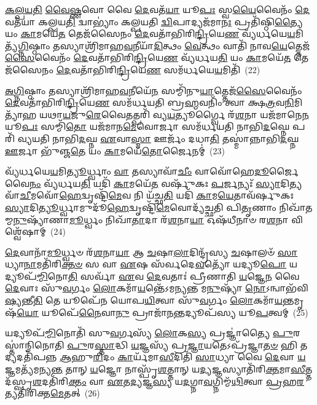 \-\ul{𑌕}\-\-\ul{𑌲𑍍𑌪}\-\-\ul{𑌯}\-\-\ul{𑌤𑌿} \ul{𑌵𑍈}\-\-\ul{𑌷𑍍𑌣}\-𑌵𑍋 𑌵𑍈 \ul{𑌦𑍇}\-𑌵𑌤᳴\-\ul{𑌯𑌾} 𑌯𑍂\-\ul{𑌪𑌃} 𑌸𑍍𑌵\-\ul{𑌯𑍈}\-𑌵𑍈𑌨𑌂᳴ \ul{𑌦𑍇}\-𑌵𑌤᳴𑌯𑌾 𑌕𑌲𑍍𑌪𑌯\-\ul{𑌤𑌿} 𑌦𑍍𑌵𑌾\-𑌭𑍍𑌯𑌾𑌂॑ 𑌕𑌲𑍍𑌪𑌯𑌤𑌿 \ul{𑌦𑍍𑌵𑌿}\-𑌪𑌾𑌦𑍍𑌯𑌜᳴𑌮𑌾\-\ul{𑌨𑌃} 𑌪𑍍𑌰𑌤𑌿᳴𑌷𑍍𑌠𑌿\-\ul{𑌤𑍍𑌯𑍈} 𑌯𑌂 \ul{𑌕𑌾}\-𑌮𑌯𑍇᳴\-\ul{𑌤} 𑌤𑍇𑌜᳴𑌸𑍈𑌨𑌂 \ul{𑌦𑍇}\-𑌵𑌤𑌾᳴𑌭𑌿𑌰𑌿\-\ul{𑌨𑍍𑌦𑍍𑌰𑌿}\-𑌯𑍇\-\ul{𑌣} 𑌵𑍍𑌯᳴𑌰𑍍𑌧𑌯𑍇\-\ul{𑌯}\-𑌮𑌿𑌤𑍍𑌯᳴\-\ul{𑌗𑍍𑌨𑌿}\-𑌷𑍍𑌠𑌾𑌂 𑌤𑌸𑍍𑌯𑌾𑌶𑍍𑌰𑌿᳴𑌮𑌾𑌹\-\ul{𑌵}\-𑌨𑍀𑌯𑌾᳴\-\ul{𑌦𑌿}\-𑌤𑍍𑌥𑌂 \ul{𑌵𑍇}\-𑌤𑍍𑌥𑌂 𑌵𑌾𑌤𑌿᳴ 𑌨𑌾𑌵\-\ul{𑌯𑍇}\-𑌤𑍍𑌤𑍇𑌜᳴\-\ul{𑌸𑍈}\-𑌵𑍈𑌨𑌂᳴ \ul{𑌦𑍇}\-𑌵𑌤𑌾᳴𑌭𑌿𑌰𑌿\-\ul{𑌨𑍍𑌦𑍍𑌰𑌿}\-𑌯𑍇\-\ul{𑌣} 𑌵𑍍𑌯᳴𑌰𑍍𑌧𑌯\-\ul{𑌤𑌿} 𑌯𑌂 \ul{𑌕𑌾}\-𑌮𑌯𑍇᳴\-\ul{𑌤} 𑌤𑍇𑌜᳴𑌸𑍈𑌨𑌂 \ul{𑌦𑍇}\-𑌵𑌤𑌾᳴𑌭𑌿𑌰𑌿\-\ul{𑌨𑍍𑌦𑍍𑌰𑌿}\-𑌯𑍇\-\ul{𑌣} 𑌸𑌮᳴𑌰𑍍𑌧𑌯𑍇\-\ul{𑌯}\-𑌮𑌿𑌤𑌿᳴~(22)

\-\ul{𑌅}\-\-\ul{𑌗𑍍𑌨𑌿}\-𑌷𑍍𑌠𑌾𑌂 𑌤𑌸𑍍𑌯𑌾𑌶𑍍𑌰𑌿᳴𑌮𑌾𑌹\-\ul{𑌵}\-𑌨𑍀𑌯𑍇᳴\-\ul{𑌨} 𑌸𑌮𑍍𑌮𑌿᳴𑌨𑍁\-\ul{𑌯𑌾}\-𑌤𑍍𑌤𑍇𑌜᳴\-\ul{𑌸𑍈}\-𑌵𑍈𑌨𑌂᳴ \ul{𑌦𑍇}\-𑌵𑌤𑌾᳴𑌭𑌿𑌰𑌿\-\ul{𑌨𑍍𑌦𑍍𑌰𑌿}\-𑌯𑍇\-\ul{𑌣} 𑌸𑌮᳴𑌰𑍍𑌧𑌯𑌤𑌿 𑌬𑍍𑌰\-\ul{𑌹𑍍𑌮}\-𑌵𑌨𑌿𑌂᳴ 𑌤𑍍𑌵𑌾 𑌕𑍍𑌷\-\ul{𑌤𑍍𑌰}\-𑌵\-\ul{𑌨𑌿}\-𑌮𑌿𑌤𑍍𑌯𑌾᳴𑌹 𑌯𑌥𑌾\-\ul{𑌯}\-𑌜𑍁\-\ul{𑌰𑍇}\-𑌵𑍈𑌤𑌤𑍍𑌪𑌰𑌿᳴ 𑌵𑍍𑌯\-\ul{𑌯}\-𑌤𑍍𑌯𑍂𑌰𑍍𑌗𑍍𑌵𑍈 𑌰᳴\-\ul{𑌶}\-𑌨𑌾 𑌯𑌜᳴𑌮𑌾𑌨𑍇\-\ul{𑌨} 𑌯𑍂\-\ul{𑌪𑌃} 𑌸𑌮𑍍𑌮𑌿᳴\-\ul{𑌤𑍋} 𑌯𑌜᳴𑌮𑌾𑌨\-\ul{𑌮𑍇}\-𑌵𑍋𑌰𑍍𑌜𑌾 𑌸𑌮᳴𑌰𑍍𑌧𑌯𑌤𑌿 𑌨𑌾𑌭𑌿\-\ul{𑌦}\-𑌘𑍍𑌨𑍇 𑌪𑌰𑌿᳴ 𑌵𑍍𑌯𑌯𑌤𑌿 𑌨𑌾𑌭𑌿\-\ul{𑌦}\-𑌘𑍍𑌨 \ul{𑌏}\-𑌵𑌾\-\ul{𑌸𑍍𑌮𑌾} 𑌊𑌰𑍍𑌜𑌂᳴ 𑌦𑌧𑌾\-\ul{𑌤𑌿} 𑌤𑌸𑍍𑌮𑌾॑𑌨𑍍𑌨𑌾𑌭𑌿\-\ul{𑌦}\-𑌘𑍍𑌨 \ul{𑌊}\-𑌰𑍍𑌜𑌾 𑌭𑍁᳴𑌞𑍍𑌜\-\ul{𑌤𑍇} 𑌯𑌂 \ul{𑌕𑌾}\-𑌮𑌯𑍇᳴\-\ul{𑌤𑍋}\-𑌰𑍍𑌜𑍈𑌨𑌮𑍍॑~(23)

𑌵𑍍𑌯᳴𑌰𑍍𑌧𑌯𑍇\-\ul{𑌯}\-𑌮𑌿\-\ul{𑌤𑍍𑌯𑍂}\-𑌰𑍍𑌧𑍍𑌵𑌾𑌂 \ul{𑌵𑌾} 𑌤𑌸𑍍𑌯𑌾𑌵𑌾᳴\-\ul{𑌚𑍀𑌂} 𑌵𑌾𑌵𑍋᳴𑌹𑍇\-\ul{𑌦𑍂}\-𑌰𑍍𑌜𑍈𑌵𑍈\-\ul{𑌨𑌂} 𑌵𑍍𑌯᳴𑌰𑍍𑌧𑌯\-\ul{𑌤𑌿} 𑌯𑌦𑌿᳴ \ul{𑌕𑌾}\-𑌮𑌯𑍇᳴\-\ul{𑌤} 𑌵𑌰𑍍\mbox{}𑌷𑍁᳴𑌕𑌃 \ul{𑌪}\-𑌰𑍍𑌜𑌨𑍍𑌯𑌃᳴ \ul{𑌸𑍍𑌯𑌾}\-𑌦𑌿𑌤𑍍𑌯𑌵𑌾᳴\-\ul{𑌚𑍀}\-𑌮𑌵𑍋᳴\-\ul{𑌹𑍇}\-\-𑌦𑍍𑌵𑍃𑌷𑍍𑌟𑌿᳴\-\ul{𑌮𑍇}\-𑌵 𑌨𑌿 𑌯᳴𑌚𑍍𑌛\-\ul{𑌤𑌿} 𑌯𑌦𑌿᳴ \ul{𑌕𑌾}\-𑌮\-\ul{𑌯𑍇}\-𑌤𑌾𑌵᳴𑌰𑍍\mbox{}𑌷𑍁𑌕𑌃 \ul{𑌸𑍍𑌯𑌾}\-𑌦𑌿\-\ul{𑌤𑍍𑌯𑍂}\-𑌰𑍍𑌧𑍍𑌵𑌾𑌮𑍁𑌦𑍂᳴\-\ul{𑌹𑍇}\-𑌦𑍍𑌵𑍃𑌷𑍍𑌟𑌿᳴\-\ul{𑌮𑍇}\-𑌵𑍋𑌦𑍍𑌯᳴𑌚𑍍𑌛𑌤𑌿 𑌪𑌿\-\ul{𑌤𑍃}\-𑌣𑌾𑌂 𑌨𑌿𑌖𑌾᳴𑌤𑌮𑍍𑌮\-\ul{𑌨𑍁}\-𑌷𑍍𑌯𑌾᳴𑌣𑌾\-\ul{𑌮𑍂}\-𑌰𑍍𑌧𑍍𑌵𑌂 𑌨𑌿𑌖𑌾᳴\-\ul{𑌤𑌾}\-𑌦𑌾 𑌰᳴\-\ul{𑌶}\-𑌨𑌾\-\ul{𑌯𑌾} 𑌓𑌷᳴𑌧𑍀𑌨𑌾𑍞 𑌰\-\ul{𑌶}\-𑌨𑌾 𑌵𑌿𑌶𑍍𑌵𑍇᳴𑌷𑌾𑌮𑍍~(24)

\-\ul{𑌦𑍇}\-𑌵𑌾𑌨𑌾᳴\-\ul{𑌮𑍂}\-𑌰𑍍𑌧𑍍𑌵𑍞 𑌰᳴\-\ul{𑌶}\-𑌨𑌾\-\ul{𑌯𑌾} 𑌆 \ul{𑌚}\-𑌷𑌾\-\ul{𑌲𑌾}\-𑌦𑌿𑌨𑍍𑌦𑍍𑌰᳴𑌸𑍍𑌯 \ul{𑌚}\-𑌷𑌾𑌲𑍞᳴ \ul{𑌸𑌾}\-𑌧𑍍𑌯𑌾\-\ul{𑌨𑌾}\-𑌮𑌤𑌿᳴𑌰𑌿\-\ul{𑌕𑍍𑌤}\-\-\ul{𑍞} 𑌸 𑌵𑌾 \ul{𑌏}\-𑌷 𑌸᳴𑌰𑍍𑌵𑌦𑍇\-\ul{𑌵}\-𑌤𑍍𑌯𑍋᳴ 𑌯𑌦𑍍𑌯𑍂\-\ul{𑌪𑍋} 𑌯𑌦𑍍𑌯𑍂𑌪᳴\-\-\ul{𑌮𑍍𑌮𑌿}\-𑌨𑍋\-\ul{𑌤𑌿} 𑌸𑌰𑍍𑌵𑌾᳴ \ul{𑌏}\-𑌵 \ul{𑌦𑍇}\-𑌵𑌤𑌾𑌃॑ 𑌪𑍍𑌰𑍀𑌣𑌾𑌤𑌿 \ul{𑌯}\-𑌜𑍍𑌞𑍇\-\ul{𑌨} 𑌵𑍈 \ul{𑌦𑍇}\-𑌵𑌾𑌃 𑌸𑍁᳴\-\ul{𑌵}\-𑌰𑍍𑌗𑌂 \ul{𑌲𑍋}\-𑌕𑌮𑌾᳴\-\ul{𑌯}\-𑌨𑍍𑌤𑍇᳴\-𑌽𑌮𑌨𑍍𑌯𑌨𑍍𑌤 𑌮\-\ul{𑌨𑍁}\-𑌷𑍍𑌯𑌾᳴ \ul{𑌨𑍋}\-\-𑌽𑌨𑍍𑌵𑌾𑌭᳴𑌵𑌿\-\ul{𑌷𑍍𑌯}\-𑌨𑍍𑌤𑍀\-\ul{𑌤𑌿} 𑌤𑍇 𑌯𑍂𑌪𑍇᳴𑌨 𑌯𑍋𑌪\-\ul{𑌯𑌿}\-𑌤𑍍𑌵𑌾 𑌸𑍁᳴\-\ul{𑌵}\-𑌰𑍍𑌗𑌂 \ul{𑌲𑍋}\-𑌕𑌮𑌾᳴\-\ul{𑌯}\-𑌨𑍍𑌤𑌮𑍃𑌷᳴\-\ul{𑌯𑍋} 𑌯𑍂𑌪𑍇᳴\-\ul{𑌨𑍈}\-𑌵𑌾\-\ul{𑌨𑍁} 𑌪𑍍𑌰𑌾𑌜𑌾᳴\-\ul{𑌨}\-𑌨𑍍𑌤𑌦𑍍𑌯𑍂𑌪᳴𑌸𑍍𑌯 𑌯𑍂\-\ul{𑌪}\-𑌤𑍍𑌵𑌮𑍍~(25)

𑌯𑌦𑍍𑌯𑍂𑌪᳴\-\ul{𑌮𑍍𑌮𑌿}\-𑌨𑍋𑌤𑌿᳴ 𑌸𑍁\-\ul{𑌵}\-𑌰𑍍𑌗𑌸𑍍𑌯᳴ \ul{𑌲𑍋}\-𑌕\-\ul{𑌸𑍍𑌯} 𑌪𑍍𑌰𑌜𑍍𑌞𑌾॑𑌤𑍍𑌯𑍈 \ul{𑌪𑍁}\-𑌰𑌸𑍍𑌤𑌾॑𑌨𑍍𑌮𑌿𑌨𑍋𑌤𑌿 \ul{𑌪𑍁}\-𑌰\-\ul{𑌸𑍍𑌤𑌾}\-𑌦𑍍𑌧𑌿 \ul{𑌯}\-𑌜𑍍𑌞𑌸𑍍𑌯᳴ 𑌪𑍍𑌰\-\ul{𑌜𑍍𑌞𑌾}\-𑌯𑌤𑍇\-𑌽𑌪𑍍𑌰᳴𑌜𑍍𑌞𑌾\-\ul{𑌤}\-\-\ul{𑍞} 𑌹𑌿 𑌤𑌦𑍍𑌯𑌦𑌤𑌿᳴𑌪𑌨𑍍𑌨 \ul{𑌆}\-𑌹𑍁\-\ul{𑌰𑌿}\-𑌦𑌂 \ul{𑌕𑌾}\-𑌰𑍍𑌯᳴𑌮𑌾\-\ul{𑌸𑍀}\-𑌦𑌿𑌤𑌿᳴ \ul{𑌸𑌾}\-𑌧𑍍𑌯𑌾 𑌵𑍈 \ul{𑌦𑍇}\-𑌵𑌾 \ul{𑌯}\-𑌜𑍍𑌞𑌮𑌤𑍍𑌯᳴𑌮𑌨𑍍𑌯\-\ul{𑌨𑍍𑌤} 𑌤𑌾𑌨𑍍 \ul{𑌯}\-𑌜𑍍𑌞𑍋 𑌨𑌾𑌸𑍍𑌪𑍃᳴\-\ul{𑌶}\-𑌤𑍍𑌤𑌾𑌨𑍍 𑌯\-\ul{𑌦𑍍𑌯}\-𑌜𑍍𑌞𑌸𑍍𑌯𑌾𑌤𑌿᳴𑌰𑌿\-\ul{𑌕𑍍𑌤}\-𑌮𑌾\-\ul{𑌸𑍀}\-𑌤𑍍𑌤𑌦᳴𑌸𑍍𑌪𑍃\-\ul{𑌶}\-\-𑌦𑌤𑌿᳴𑌰𑌿\-\ul{𑌕𑍍𑌤𑌂} 𑌵𑌾 \ul{𑌏}\-𑌤\-\ul{𑌦𑍍𑌯}\-𑌜𑍍𑌞\-\ul{𑌸𑍍𑌯} 𑌯\-\ul{𑌦}\-𑌗𑍍𑌨𑌾\-\ul{𑌵}\-𑌗𑍍𑌨𑌿𑌮𑍍𑌮᳴\-\ul{𑌥𑌿}\-𑌤𑍍𑌵𑌾 \ul{𑌪𑍍𑌰}\-𑌹\-\ul{𑌰}\-𑌤𑍍𑌯𑌤𑌿᳴𑌰𑌿𑌕𑍍𑌤\-\ul{𑌮𑍇}\-𑌤𑌤𑍍~(26)

